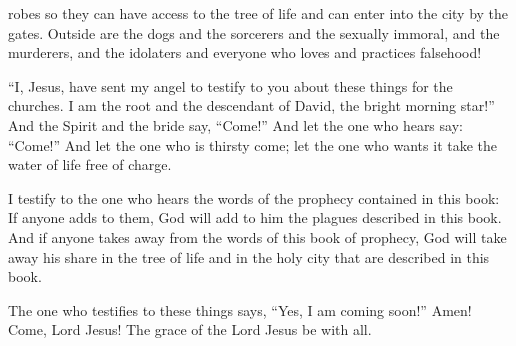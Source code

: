 {robes
so
they
can have
access
to
the tree
of life
and
can enter
into
the city
by the gates.
Outside
are the dogs
and
the sorcerers
and
the sexually immoral,
and
the murderers,
and
the idolaters
and
everyone
who loves
and
practices
falsehood!
\par }{\PP {}“I,
Jesus,
have sent
my
angel
to testify
to you
about these things
for
the churches.
I
am
the root
and
the descendant
of David,
the bright
morning
star!”
And
the Spirit
and
the bride
say,
“Come!” And
let the one who hears
say: “Come!” And
let the one who is thirsty
come;
let the one who wants
it take
the water
of life
free of charge.
\par }{\PP {}I
testify
to the one who hears
the words
of the prophecy
contained in this
book: If
anyone
adds
to
them,
God
will add
to
him
the plagues
described
in
this
book.
And
if
anyone
takes away
from
the words
of this
book
of prophecy,
God
will take away
his
share
in
the
tree
of life
and
in
the holy
city
that are described
in
this
book.
\par }{\PP {}The one who testifies
to these things
says, “Yes,
I am coming
soon!” Amen! Come,
Lord
Jesus!
The grace
of the Lord
Jesus
be with
all.
\par }